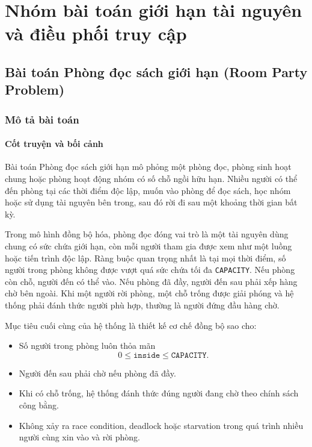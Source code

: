 \chapter{Nhóm bài toán giới hạn tài nguyên và điều phối truy cập}

\section{Bài toán Phòng đọc sách giới hạn (Room Party Problem)}

\subsection{Mô tả bài toán}

\subsubsection*{Cốt truyện và bối cảnh}

Bài toán Phòng đọc sách giới hạn mô phỏng một phòng đọc, phòng sinh hoạt
chung hoặc phòng hoạt động nhóm có số chỗ ngồi hữu hạn. Nhiều người có
thể đến phòng tại các thời điểm độc lập, muốn vào phòng để đọc sách,
học nhóm hoặc sử dụng tài nguyên bên trong, sau đó rời đi sau một khoảng
thời gian bất kỳ.

Trong mô hình đồng bộ hóa, phòng đọc đóng vai trò là một tài nguyên dùng
chung có sức chứa giới hạn, còn mỗi người tham gia được xem như một luồng
hoặc tiến trình độc lập. Ràng buộc quan trọng nhất là tại mọi thời điểm,
số người trong phòng không được vượt quá sức chứa tối đa
\texttt{CAPACITY}. Nếu phòng còn chỗ, người đến có thể vào. Nếu phòng đã
đầy, người đến sau phải xếp hàng chờ bên ngoài. Khi một người rời phòng,
một chỗ trống được giải phóng và hệ thống phải đánh thức người phù hợp,
thường là người đứng đầu hàng chờ.

Mục tiêu cuối cùng của hệ thống là thiết kế cơ chế đồng bộ sao cho:

\begin{itemize}
    \item Số người trong phòng luôn thỏa mãn
    \[
        0 \leq \texttt{inside} \leq \texttt{CAPACITY}.
    \]
    \item Người đến sau phải chờ nếu phòng đã đầy.
    \item Khi có chỗ trống, hệ thống đánh thức đúng người đang chờ theo
    chính sách công bằng.
    \item Không xảy ra race condition, deadlock hoặc starvation trong quá
    trình nhiều người cùng xin vào và rời phòng.
\end{itemize}

